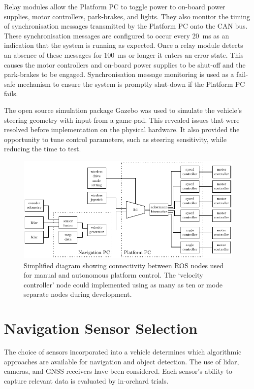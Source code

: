 \documentclass[preprint,authoryear,12pt]{elsarticle}
\begin{document}
        Relay modules allow the Platform PC to toggle power to on-board power supplies, motor controllers, park-brakes, and lights.
        They also monitor the timing of synchronisation messages transmitted by the Platform PC onto the CAN bus.
        These synchronisation messages are configured to occur every \SI{20}{\milli\second} as an indication that the system is running as expected.
        Once a relay module detects an absence of these messages for \SI{100}{\milli\second} or longer it enters an error state.
        This causes the motor controllers and on-board power supplies to be shut-off and the park-brakes to be engaged.
        Synchronisation message monitoring is used as a fail-safe mechanism to ensure the system is promptly shut-down if the Platform PC fails.

        The open source simulation package Gazebo was used to simulate the vehicle's steering geometry with input from a game-pad.
        This revealed issues that were resolved before implementation on the physical hardware.
        It also provided the opportunity to tune control parameters, such as steering sensitivity, while reducing the time to test.

        \begin{figure}[htb]
            \centering
            \includegraphics[width=\linewidth]{imgs/system_diagram/software_v2.pdf}
            \caption{Simplified diagram showing connectivity between ROS nodes used for manual and autonomous platform control.
            The `velocity controller' node could implemented using as many as ten or mode separate nodes during development.}
            \label{fig:system_diagram_software}
        \end{figure}


\section{Navigation Sensor Selection}
\label{sect:sensors}
    The choice of sensors incorporated into a vehicle determines which algorithmic approaches are available for navigation and object detection.
    The use of lidar, cameras, and GNSS receivers have been considered.
    Each sensor's ability to capture relevant data is evaluated by in-orchard trials.
\end{document}
